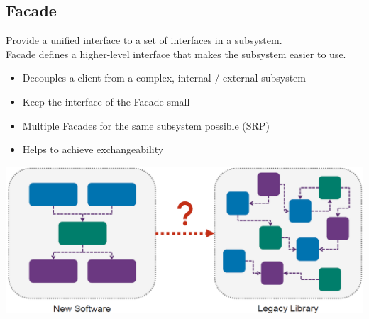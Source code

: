 \subsection{Facade}
Provide a unified interface to a set of interfaces in a subsystem.\\
Facade defines a higher-level interface that makes the subsystem easier to use.\\
\begin{itemize}
    \item Decouples a client from a complex, internal / external subsystem
    \item Keep the interface of the Facade small
    \item Multiple Facades for the same subsystem possible (SRP)
    \item Helps to achieve exchangeability
\end{itemize}
\includegraphics[width=\linewidth]{../img/facade_pattern.png}

